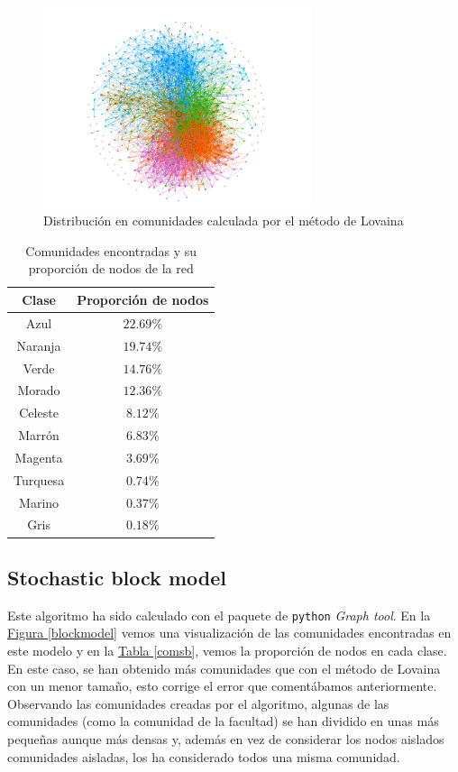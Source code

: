 \documentclass[10pt,a4paper,spanish]{article}
\numberwithin{equation}{section} %
\numberwithin{figure}{section} %
\numberwithin{table}{section} %
\begin{document}
\begin{figure}[!h]
    \centering
    \includegraphics[width=0.7\textwidth]{lovaina}
    \caption{Distribución en comunidades calculada por el método de Lovaina}
    \label{lovaina}
\end{figure}

\begin{table}[!h]
\centering
\begin{tabular}{c | c}
Clase & Proporción de nodos \\
\hline
Azul & $22.69\%$ \\
Naranja & $19.74\%$ \\
Verde & $14.76\%$ \\
Morado & $12.36\%$ \\
Celeste & $8.12\%$ \\
Marrón & $6.83\%$ \\
Magenta & $3.69\%$ \\
Turquesa & $0.74\%$ \\
Marino & $0.37\%$ \\
Gris & $0.18\%$
\end{tabular}
\caption{Comunidades encontradas y su proporción de nodos de la red}
\label{comsl}
\end{table}

\subsection{Stochastic block model}
Este algoritmo ha sido calculado con el paquete de \texttt{python} \textit{Graph tool}. En la \hyperref[blockmodel]{Figura \ref*{blockmodel}} vemos una visualización de las comunidades encontradas en este modelo y en la \hyperref[comsb]{Tabla \ref*{comsb}}, vemos la proporción de nodos en cada clase. En este caso, se han obtenido más comunidades que con el método de Lovaina con un menor tamaño, esto corrige el error que comentábamos anteriormente. Observando las comunidades creadas por el algoritmo, algunas de las comunidades (como la comunidad de la facultad) se han dividido en unas más pequeñas aunque más densas y, además en vez de considerar los nodos aislados comunidades aisladas, los ha considerado todos una misma comunidad.
\end{document}
